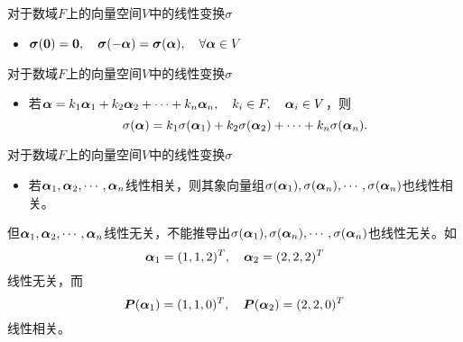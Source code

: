 \begin{frame} 
  对于数域$F$上的向量空间$V$中的线性变换$\sigma$
  
  \begin{itemize}
  \item $\sigmabd(\M0)=\M0, \quad \sigmabd(-\alphabd)=\sigmabd(\alphabd), \quad \forall\alphabd\in V$
  \end{itemize}
\end{frame}

\begin{frame} 
    对于数域$F$上的向量空间$V$中的线性变换$\sigma$

  \begin{itemize}
  \item 若$\boldsymbol{\alpha}=k_1\boldsymbol{\alpha}_1+k_2\boldsymbol{\alpha}_2+\cdots+k_n\boldsymbol{\alpha}_n, \quad k_i\in F, \quad \boldsymbol{\alpha}_i\in V$，则
    $$
    \sigma(\boldsymbol{\alpha})=k_1\sigma(\boldsymbol{\alpha}_1)+k_2\sigma(\boldsymbol{\alpha}_2)+\cdots+k_n\sigma(\boldsymbol{\alpha}_n).
    $$
  \end{itemize}
\end{frame}

\begin{frame} 
    对于数域$F$上的向量空间$V$中的线性变换$\sigma$

  \begin{itemize}
  \item 若$\boldsymbol{\alpha}_1, \boldsymbol{\alpha}_2, \cdots, \boldsymbol{\alpha}_n$线性相关，则其象向量组$\sigma(\boldsymbol{\alpha}_1),\sigma(\boldsymbol{\alpha}_n),\cdots,\sigma(\boldsymbol{\alpha}_n)$也线性相关。
  \end{itemize}

  \vspace{.1in}
  \pause 

  \begin{zhu}
    但$\boldsymbol{\alpha}_1, \boldsymbol{\alpha}_2, \cdots, \boldsymbol{\alpha}_n$线性无关，不能推导出$\sigma(\boldsymbol{\alpha}_1),\sigma(\boldsymbol{\alpha}_n),\cdots,\sigma(\boldsymbol{\alpha}_n)$也线性无关。如
    $$
    \boldsymbol{\alpha}_1=(1,1,2)^T, \quad \boldsymbol{\alpha}_2=(2,2,2)^T
    $$
    线性无关，而
    $$
    \boldsymbol{P}(\boldsymbol{\alpha}_1)=(1,1,0)^T, \quad \boldsymbol{P}(\boldsymbol{\alpha}_2)=(2,2,0)^T
    $$
    线性相关。
  \end{zhu}
\end{frame}

